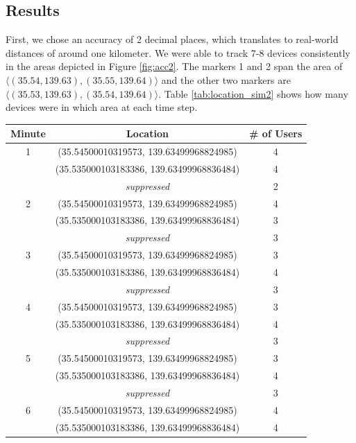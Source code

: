 \subsection{Results}
First, we chose an accuracy of 2 decimal places, which translates to real-world distances of around one kilometer. We were able to track 7-8 devices consistently in the areas depicted in Figure \ref{fig:acc2}. The markers 1 and 2 span the area of \(\langle(35.54, 139.63),(35.55, 139.64)\rangle\) and the other two markers are \(\langle(35.53, 139.63),(35.54, 139.64)\rangle\). Table \ref{tab:location_sim2} shows how many devices were in which area at each time step. 

\begin{table}[htbp]
    \centering
    \begin{tabular}{|c|c|c|} 
        \hline
        \textbf{Minute} & \textbf{Location} & \textbf{\# of Users}\\ [0.5ex] 
        \hline
        1 & (35.54500010319573, 139.63499968824985) & 4 \\ 
        & (35.535000103183386, 139.63499968836484) & 4 \\ 
        &\textit{suppressed} & 2 \\ 
        \hline
        2 & (35.54500010319573, 139.63499968824985) & 4 \\ 
        & (35.535000103183386, 139.63499968836484) & 3 \\ 
        &\textit{suppressed} & 3 \\ 
        \hline
        3 & (35.54500010319573, 139.63499968824985) & 3 \\ 
        & (35.535000103183386, 139.63499968836484) & 4 \\ 
        &\textit{suppressed} & 3 \\ 
        \hline
        4 & (35.54500010319573, 139.63499968824985) & 3 \\ 
        & (35.535000103183386, 139.63499968836484) & 4 \\ 
        &\textit{suppressed} & 3 \\ 
        \hline
        5 & (35.54500010319573, 139.63499968824985) & 3 \\ 
        & (35.535000103183386, 139.63499968836484) & 4 \\ 
        &\textit{suppressed} & 3 \\ 
        \hline
        6 & (35.54500010319573, 139.63499968824985) & 4 \\ 
        & (35.535000103183386, 139.63499968836484) & 4 \\ 

\end{tabular}
\end{table}

